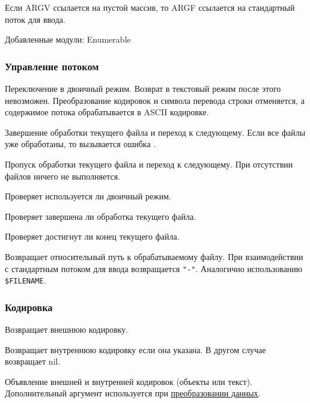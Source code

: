 Если ARGV ссылается на пустой массив, то ARGF ссылается на стандартный поток для ввода.

Добавленные модули: Enumerable

\subsubsection{Управление потоком}

\begin{methodlist}
  Переключение в двоичный режим. Возврат в текстовый режим после этого невозможен. Преобразование кодировок и символа перевода строки отменяется, а содержимое потока обрабатывается в ASCII кодировке. 

  Завершение обработки текущего файла и переход к следующему. Если все файлы уже обработаны, то вызывается ошибка . 

  Пропуск обработки текущего файла и переход к следующему. При отсутствии файлов ничего не выполняется.


  Проверяет используется ли двоичный режим. 

  Проверяет завершена ли обработка текущего файла. 

  Проверяет достигнут ли конец текущего файла. 

  Возвращает относительный путь к обрабатываемому файлу. При взаимодействии с стандартным потоком для ввода возвращается \verb!"-"!. Аналогично использованию \verb!$FILENAME!. 
\end{methodlist}

\subsubsection{Кодировка}

\begin{methodlist}
  Возвращает внешнюю кодировку.
 
  Возвращает внутреннюю кодировку если она указана. В другом случае возвращает nil. 

  Объявление внешней и внутренней кодировок (объекты или текст). Дополнительный аргумент используется при \hyperlink{appencode}{\underline{преобразовании данных}}. 
\end{methodlist}

